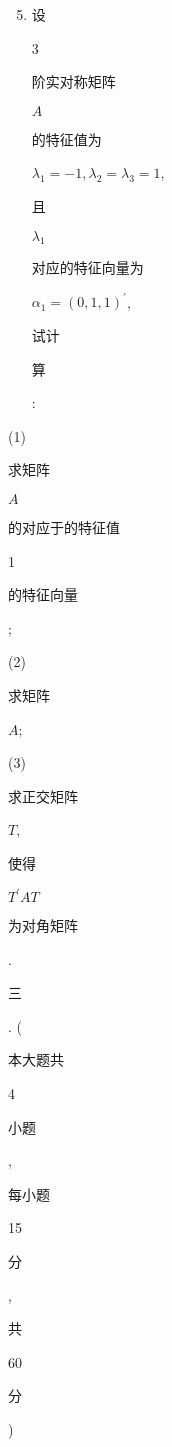 \documentclass[10pt]{article}
\begin{document}
\begin{enumerate}
  \setcounter{enumi}{4}
  \item \begin{CJK}{UTF8}{mj}设\end{CJK} 3 \begin{CJK}{UTF8}{mj}阶实对称矩阵\end{CJK} $A$ \begin{CJK}{UTF8}{mj}的特征值为\end{CJK} $\lambda_{1}=-1, \lambda_{2}=\lambda_{3}=1$, \begin{CJK}{UTF8}{mj}且\end{CJK} $\lambda_{1}$ \begin{CJK}{UTF8}{mj}对应的特征向量为\end{CJK} $\alpha_{1}=(0,1,1)^{\prime}$, \begin{CJK}{UTF8}{mj}试计\end{CJK} \begin{CJK}{UTF8}{mj}算\end{CJK}:
\end{enumerate}
(1) \begin{CJK}{UTF8}{mj}求矩阵\end{CJK} $A$ \begin{CJK}{UTF8}{mj}的对应于的特征值\end{CJK} 1 \begin{CJK}{UTF8}{mj}的特征向量\end{CJK};

(2) \begin{CJK}{UTF8}{mj}求矩阵\end{CJK} $A$;

(3) \begin{CJK}{UTF8}{mj}求正交矩阵\end{CJK} $T$, \begin{CJK}{UTF8}{mj}使得\end{CJK} $T^{\prime} A T$ \begin{CJK}{UTF8}{mj}为对角矩阵\end{CJK}.

\begin{CJK}{UTF8}{mj}三\end{CJK}. (\begin{CJK}{UTF8}{mj}本大题共\end{CJK} 4 \begin{CJK}{UTF8}{mj}小题\end{CJK}, \begin{CJK}{UTF8}{mj}每小题\end{CJK} 15 \begin{CJK}{UTF8}{mj}分\end{CJK}, \begin{CJK}{UTF8}{mj}共\end{CJK} 60 \begin{CJK}{UTF8}{mj}分\end{CJK})
\end{document}
